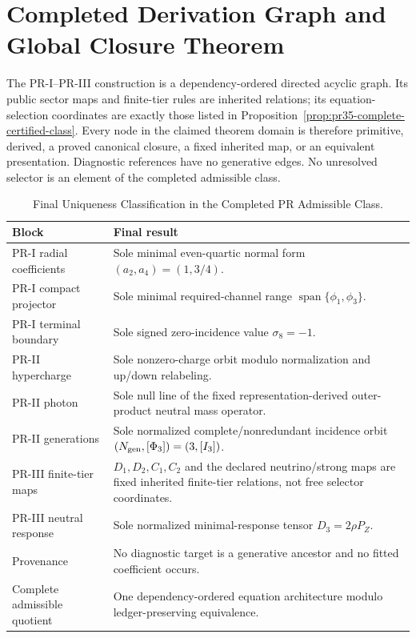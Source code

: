\section{Completed Derivation Graph and Global Closure Theorem}
\label{sec:derivation-graph-verdict}

The PR-I--PR-III construction is a dependency-ordered directed acyclic graph. Its public sector maps and finite-tier rules are inherited relations; its equation-selection coordinates are exactly those listed in Proposition~\ref{prop:pr35-complete-certified-class}.  Every node in the claimed theorem domain is therefore primitive, derived, a proved canonical closure, a fixed inherited map, or an equivalent presentation.  Diagnostic references have no generative edges.  No unresolved selector is an element of the completed admissible class.

\begin{table}[H]
\centering
\caption{Final Uniqueness Classification in the Completed PR Admissible Class.}
\label{tab:pr35-status}
\begin{tabularx}{\textwidth}{@{}p{}X@{}}
\toprule
Block & Final result \\
\midrule
PR-I radial coefficients & Sole minimal even-quartic normal form $(a_2,a_4)=(1,3/4)$. \\
PR-I compact projector & Sole minimal required-channel range $\operatorname{span}\{\phi_1,\phi_3\}$. \\
PR-I terminal boundary & Sole signed zero-incidence value $\sigma_8=-1$. \\
PR-II hypercharge & Sole nonzero-charge orbit modulo normalization and up/down relabeling. \\
PR-II photon & Sole null line of the fixed representation-derived outer-product neutral mass operator. \\
PR-II generations & Sole normalized complete/nonredundant incidence orbit $(N_{\rm gen},[\Phi_3])=(3,[I_3])$. \\
PR-III finite-tier maps & $D_1,D_2,C_1,C_2$ and the declared neutrino/strong maps are fixed inherited finite-tier relations, not free selector coordinates. \\
PR-III neutral response & Sole normalized minimal-response tensor $D_3=2\rho P_Z$. \\
Provenance & No diagnostic target is a generative ancestor and no fitted coefficient occurs. \\
Complete admissible quotient & One dependency-ordered equation architecture modulo ledger-preserving equivalence. \\
\bottomrule
\end{tabularx}
\end{table}

